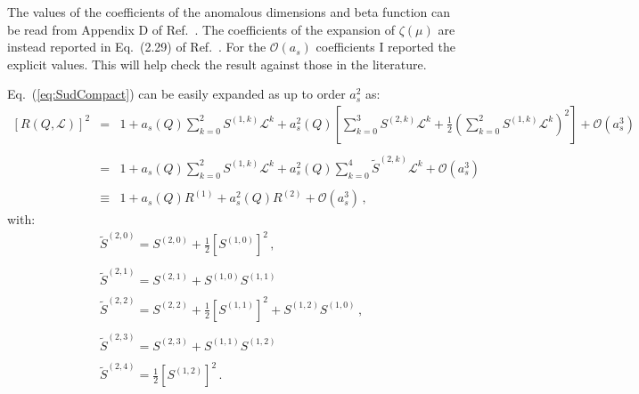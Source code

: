 \documentclass[10pt,a4paper]{article}
\begin{document}
The values of the coefficients of the anomalous dimensions and beta
function can be read from Appendix D of
Ref.~\cite{Echevarria:2016scs}. The coefficients of the expansion of
$\zeta(\mu)$ are instead reported in Eq.~(2.29) of
Ref.~\cite{Scimemi:2017etj}. For the $\mathcal{O}(a_s)$ coefficients I
reported the explicit values. This will help check the result against
those in the literature.

Eq.~(\ref{eq:SudCompact}) can be easily expanded as up to order
$a_s^2$ as:
\begin{equation}\label{eq:exp1}
\begin{array}{rcl}
  \displaystyle \left[R(Q,\mathcal{L})\right]^2&=&\displaystyle
                                         1+a_s(Q)\sum_{k=0}^{2}S^{(1,k)}\mathcal{L}^k+a_s^2(Q)\left[\sum_{k=0}^{3}S^{(2,k)}\mathcal{L}^k+\frac12\left(\sum_{k=0}^{2}S^{(1,k)}\mathcal{L}^k\right)^2\right]+\mathcal{O}(a_s^3)\\
  \\
                                     &=&\displaystyle
                                         1+a_s(Q)\sum_{k=0}^{2}S^{(1,k)}\mathcal{L}^k+a_s^2(Q)
                                         \sum_{k=0}^{4}\widetilde{S}^{(2,k)}\mathcal{L}^k
                                         +\mathcal{O}(a_s^3)\\
\\
&\equiv&\displaystyle  1+a_s(Q)R^{(1)}+a_s^2(Q)
                                         R^{(2)}+\mathcal{O}(a_s^3)\,,
\end{array}
\end{equation}
with:
\begin{equation}
\begin{array}{l}
\displaystyle  \widetilde{S}^{(2,0)}={S}^{(2,0)}+\frac12
  \left[S^{(1,0)}\right]^2\,,\\
  \\
\displaystyle    \widetilde{S}^{(2,1)}={S}^{(2,1)}+{S}^{(1,0)}{S}^{(1,1)}\\
\\
\displaystyle    \widetilde{S}^{(2,2)}={S}^{(2,2)}+\frac12 \left[S^{(1,1)}\right]^2+{S}^{(1,2)}{S}^{(1,0)}\,,\\
\\
\displaystyle   \widetilde{S}^{(2,3)}={S}^{(2,3)}+{S}^{(1,1)}{S}^{(1,2)}\\
\\
\displaystyle    \widetilde{S}^{(2,4)}=\frac12 \left[S^{(1,2)}\right]^2\,.
\end{array}
\end{equation}
\end{document}
